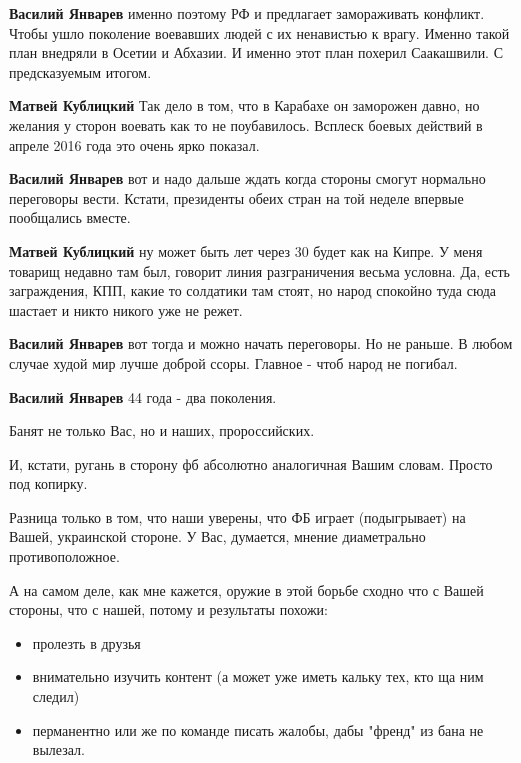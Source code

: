 \begin{itemize}
\begin{itemize}
\textbf{Василий Январев} именно поэтому РФ и предлагает замораживать конфликт. Чтобы ушло поколение воевавших людей с их ненавистью к врагу. Именно такой план внедряли в Осетии и Абхазии. И именно этот план похерил Саакашвили. С предсказуемым итогом.

\textbf{Матвей Кублицкий} Так дело в том, что в Карабахе он заморожен давно, но желания у сторон воевать как то не поубавилось. Всплеск боевых действий в апреле 2016 года это очень ярко показал.

\textbf{Василий Январев} вот и надо дальше ждать когда стороны смогут нормально переговоры вести. Кстати, президенты обеих стран на той неделе впервые пообщались вместе.

\textbf{Матвей Кублицкий} ну может быть лет через 30 будет как на Кипре. У меня товарищ недавно там был, говорит линия разграничения весьма условна. Да, есть заграждения, КПП, какие то солдатики там стоят, но народ спокойно туда сюда шастает и никто никого уже не режет.

\textbf{Василий Январев} вот тогда и можно начать переговоры. Но не раньше. В любом случае худой мир лучше доброй ссоры. Главное - чтоб народ не погибал.

\textbf{Василий Январев} 44 года - два поколения.
\end{itemize} %


Банят не только Вас, но и наших, пророссийских.

И, кстати, ругань в сторону фб абсолютно аналогичная Вашим словам. Просто под
копирку.

Разница только в том, что наши уверены, что ФБ играет (подыгрывает) на Вашей,
украинской стороне. У Вас, думается, мнение диаметрально противоположное.

А на самом деле, как мне кажется, оружие в этой борьбе сходно что с Вашей
стороны, что с нашей, потому и результаты похожи:

\begin{itemize}
  \item  пролезть в друзья
  \item  внимательно изучить контент (а может уже иметь кальку тех, кто ща ним следил)
  \item  перманентно или же по команде писать жалобы, дабы "френд" из бана не вылезал.
\end{itemize}


\end{itemize}
